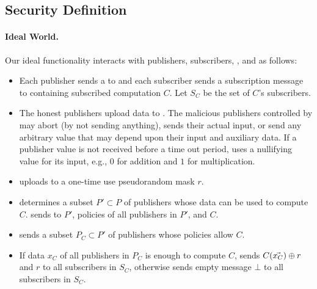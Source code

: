 \subsection{Security Definition}


\paragraph{Ideal World.}
Our ideal functionality \F interacts with publishers, subscribers, \broker, and
\garbler as follows:

\begin{itemize}[leftmargin=*]
		\item Each publisher sends a \policy to \F and each subscriber sends a
			subscription message to \F containing subscribed computation $C$. Let $S_C$
			be the set of $C$'s subscribers. 
			
		
		\item The honest publishers upload data to \F. The malicious publishers
			controlled by \Adv may abort (by not sending anything), sends their
			actual input, or send any arbitrary value that may depend upon their
			input and auxiliary data. If a publisher value is not received before a
			time out period, \F uses a nullifying value for its input, e.g., $0$ for
			addition and $1$ for multiplication. 
		
		\item \garbler uploads to \F a one-time use pseudorandom mask $r$.

		\item \F determines a subset $P' \subset P$ of publishers whose data can be
			used to compute $C$. \F sends to \broker $P'$, policies of all publishers
			in $P'$, and $C$.

		\item \broker sends \F a subset $P_C \subset P'$ of publishers whose
			policies allow $C$.
			
		\item If data $x_C$ of all publishers in $P_C$ is enough to compute $C$, \F
			sends $C(\vec{x_C}) \oplus r$ and $r$ to all subscribers in $S_C$,
			otherwise \F sends empty message $\bot$ to all subscribers in $S_C$. 

\end{itemize}

